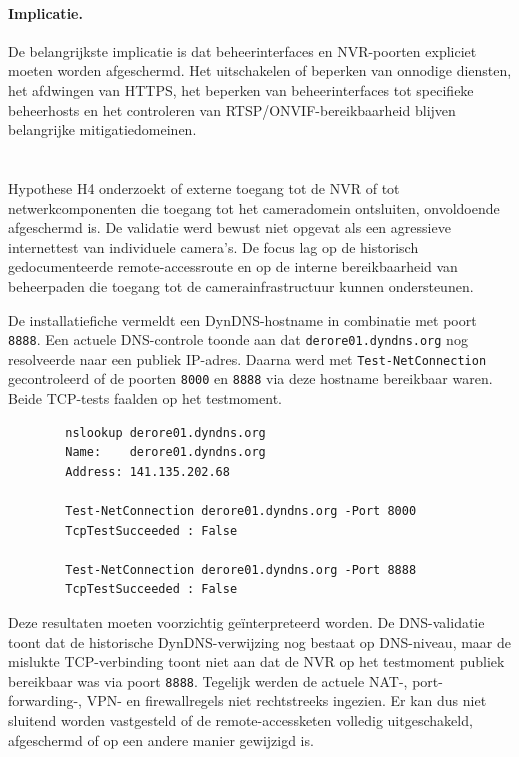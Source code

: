 \paragraph{Implicatie.}
De belangrijkste implicatie is dat beheerinterfaces en NVR-poorten expliciet moeten worden afgeschermd. Het uitschakelen of beperken van onnodige diensten, het afdwingen van HTTPS, het beperken van beheerinterfaces tot specifieke beheerhosts en het controleren van RTSP/ONVIF-bereikbaarheid blijven belangrijke mitigatiedomeinen.


\section{}%
\label{sec:h4-remote-access}

Hypothese H4 onderzoekt of externe toegang tot de NVR of tot netwerkcomponenten die toegang tot het cameradomein ontsluiten, onvoldoende afgeschermd is. De validatie werd bewust niet opgevat als een agressieve internettest van individuele camera's. De focus lag op de historisch gedocumenteerde remote-accessroute en op de interne bereikbaarheid van beheerpaden die toegang tot de camerainfrastructuur kunnen ondersteunen.

De installatiefiche vermeldt een DynDNS-hostname in combinatie met poort \texttt{8888}. Een actuele DNS-controle toonde aan dat \texttt{derore01.dyndns.org} nog resolveerde naar een publiek IP-adres. Daarna werd met \texttt{Test-NetConnection} gecontroleerd of de poorten \texttt{8000} en \texttt{8888} via deze hostname bereikbaar waren. Beide TCP-tests faalden op het testmoment.

{\small
    \begin{verbatim}
        nslookup derore01.dyndns.org
        Name:    derore01.dyndns.org
        Address: 141.135.202.68
        
        Test-NetConnection derore01.dyndns.org -Port 8000
        TcpTestSucceeded : False
        
        Test-NetConnection derore01.dyndns.org -Port 8888
        TcpTestSucceeded : False
    \end{verbatim}
}

Deze resultaten moeten voorzichtig geïnterpreteerd worden. De DNS-validatie toont dat de historische DynDNS-verwijzing nog bestaat op DNS-niveau, maar de mislukte TCP-verbinding toont niet aan dat de NVR op het testmoment publiek bereikbaar was via poort \texttt{8888}. Tegelijk werden de actuele NAT-, port-forwarding-, VPN- en firewallregels niet rechtstreeks ingezien. Er kan dus niet sluitend worden vastgesteld of de remote-accessketen volledig uitgeschakeld, afgeschermd of op een andere manier gewijzigd is.

